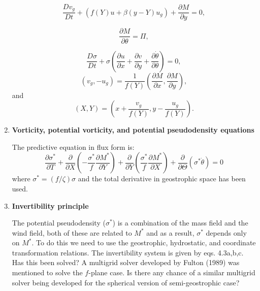 \documentclass[11pt]{report}
\begin{document}
\begin{enumerate}
\begin{equation}
    \frac{Dv_g}{Dt}+(f(Y)u+\beta(y-Y)u_g)+\frac{\partial M}{\partial y}=0,
\end{equation}

\begin{equation}
    \frac{\partial M}{\partial \theta}=\Pi,
\end{equation}

\begin{equation}
    \frac{D\sigma}{Dt}+\sigma\left(\frac{\partial u}{\partial x}+
    \frac{\partial v}{\partial y}+\frac{\partial\dot{\theta}}{\partial\theta}
    \right)=0,
\end{equation}
\begin{equation}
    (v_g,-u_g)=\frac{1}{f(Y)}\left(\frac{\partial M}{\partial x},
    \frac{\partial M}{\partial y}\right),
\end{equation}
and 
\begin{equation}
    (X,Y)=\left(x+\frac{v_g}{f(Y)},y-\frac{u_g}{f(Y)}\right).
\end{equation}

\item{\textbf{Vorticity, potential vorticity, and potential pseudodensity
equations}}

The predictive equation in flux form is: 
\begin{equation}
    \frac{\partial\sigma^*}{\partial T}+\frac{\partial}{\partial X}\left(
    -\frac{\sigma^*}{f}\frac{\partial M^*}{\partial Y}\right)+
    \frac{\partial}{\partial Y}\left(\frac{\sigma^*}{f}
    \frac{\partial M^*}{\partial X}\right)+
    \frac{\partial}{\partial\Theta}(\sigma^*\dot{\theta})=0
\end{equation}
where $\sigma^*=(f/\zeta)\sigma$ and the total derivative in geostrophic space
has been used.  

\item{\textbf{Invertibility principle}}

The potential pseudodensity ($\sigma^*$) is a combination of the mass field and the wind field, both
of these are
related to $M^*$ and as a result, $\sigma^*$ depends only on $M^*$.  To do this we need to use the
geostrophic, hydrostatic, and coordinate transformation relations.  The invertibility system is
given by eqs. 4.3a,b,c.  Has this been solved?  A multigrid solver developed by Fulton (1989) was
mentioned to solve the $f$-plane case.  Is there any chance of a similar multigrid solver being
developed for the spherical version of semi-geostrophic case?  


\end{enumerate}
\end{document}
